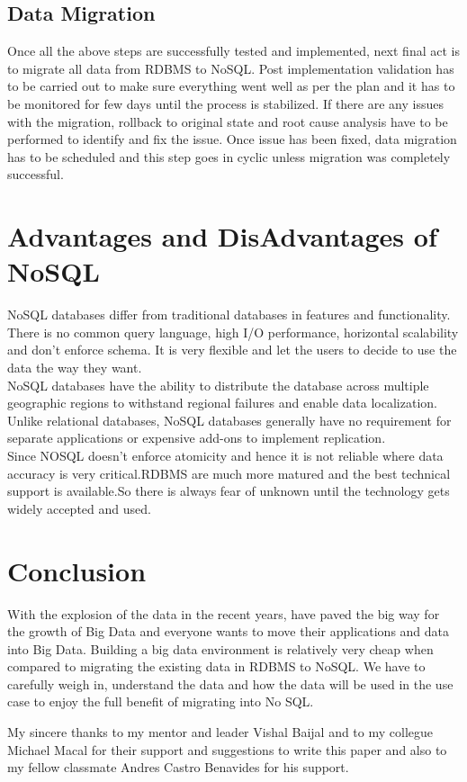 \documentclass[sigconf]{acmart}
\begin{document}
\subsection{Data Migration} 
Once all the above steps are successfully tested and implemented, next final act is to migrate all data from RDBMS to NoSQL. Post implementation validation has to be carried out to make sure everything went well as per the plan and it has to be monitored for few days until the process is stabilized. If there are any issues with the migration, rollback to original state and root cause analysis have to be performed to identify and fix the issue. Once issue has been fixed, data migration has to be scheduled and this step goes in cyclic unless migration was completely successful. 

\section{Advantages and DisAdvantages of NoSQL}
NoSQL databases differ from traditional databases in features and functionality. There is no common query language, high I/O performance, horizontal scalability and don't enforce schema. It is very flexible and let the users to decide to use the data the way they want.\\
NoSQL databases have the ability to distribute the database across multiple geographic regions to withstand regional failures and enable data localization. Unlike relational databases, NoSQL databases generally have no requirement for separate applications or expensive add-ons to implement replication.\cite{mongo}\\
Since NOSQL doesn't enforce atomicity and hence it is not reliable where data accuracy is very critical.RDBMS are much more matured and the best technical support is available.So there is always fear of unknown until the technology gets widely accepted and used.


\section{Conclusion}
With the explosion of the data in the recent years, have paved the big way for the growth of Big Data and everyone wants to move their applications and data into Big Data. Building a big data environment is relatively very cheap when compared to migrating the existing data in RDBMS to NoSQL. We have to carefully weigh in, understand the data and how the data will be used in the use case to enjoy the full benefit of migrating into No SQL.

\begin{acks}
My sincere thanks to my mentor and leader Vishal Baijal and to my collegue Michael Macal for their support and suggestions to write this paper and also to my fellow classmate Andres Castro Benavides for his support.
\end{acks}


\printbibliography 
\end{document}
